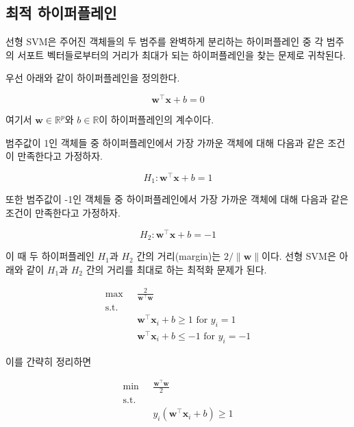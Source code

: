 \documentclass[
]{book}
\begin{document}
\hypertarget{linear-svm-separable-hyperplane}{%
\subsection{최적 하이퍼플레인}\label{linear-svm-separable-hyperplane}}

선형 SVM은 주어진 객체들의 두 범주를 완벽하게 분리하는 하이퍼플레인 중 각 범주의 서포트 벡터들로부터의 거리가 최대가 되는 하이퍼플레인을 찾는 문제로 귀착된다.

우선 아래와 같이 하이퍼플레인을 정의한다.

\begin{equation}
\mathbf{w}^\top \mathbf{x} + b = 0 \label{eq:linear-svm-hyperplane}
\end{equation}

여기서 \(\mathbf{w} \in \mathbb{R}^p\)와 \(b \in \mathbb{R}\)이 하이퍼플레인의 계수이다.

범주값이 1인 객체들 중 하이퍼플레인에서 가장 가까운 객체에 대해 다음과 같은 조건이 만족한다고 가정하자.

\[
H_1: \mathbf{w}^\top \mathbf{x} + b = 1 
\]

또한 범주값이 -1인 객체들 중 하이퍼플레인에서 가장 가까운 객체에 대해 다음과 같은 조건이 만족한다고 가정하자.

\[
H_2: \mathbf{w}^\top \mathbf{x} + b = -1
\]

이 때 두 하이퍼플레인 \(H_1\)과 \(H_2\) 간의 거리(margin)는 \(2 / \lVert \mathbf{w} \rVert\)이다. 선형 SVM은 아래와 같이 \(H_1\)과 \(H_2\) 간의 거리를 최대로 하는 최적화 문제가 된다.

\begin{equation*}
\begin{split}
\max \text{  } & \frac{2}{\mathbf{w}^\top \mathbf{w}}\\
\text{s.t.}& \\
& \mathbf{w}^\top \mathbf{x}_i + b \ge 1 \text{ for } y_i = 1\\
& \mathbf{w}^\top \mathbf{x}_i + b \le -1 \text{ for } y_i = -1
\end{split}
\end{equation*}

이를 간략히 정리하면

\begin{equation*}
\begin{split}
\min \text{  } & \frac{\mathbf{w}^\top \mathbf{w}}{2}\\
\text{s.t.}& \\
& y_i \left( \mathbf{w}^\top \mathbf{x}_i + b \right) \ge 1
\end{split}
\end{equation*}
\end{document}
